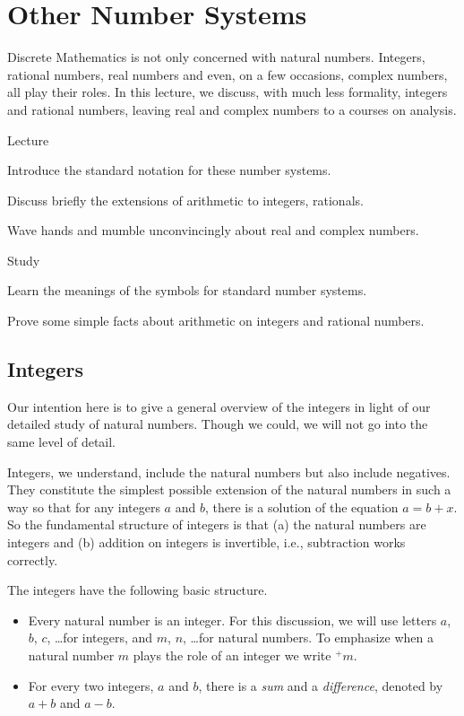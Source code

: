 \chapter{Other Number Systems}\label{lec:OtherNumbers}

Discrete Mathematics is not only concerned with natural numbers. Integers, rational numbers, real numbers and even, on a few occasions, complex numbers, all play their roles. In this lecture, we discuss, with much less formality, integers and rational numbers, leaving real and complex numbers to a courses on analysis.

\begin{goals}
\begin{goal}{Lecture}
\item Introduce the standard notation for these number systems.
\item Discuss briefly the extensions of arithmetic to integers, rationals.
\item Wave hands and mumble unconvincingly about real and complex numbers.
\end{goal}

\begin{goal}{Study}
\item Learn the meanings of the symbols for standard number systems.
\item Prove some simple facts about arithmetic on integers and rational numbers.
\end{goal}
\end{goals}

\section{Integers}

Our intention here is to give a general overview of the integers in light of our detailed study of natural numbers.
Though we could, we will not go into the same level of detail.

Integers, we understand, include the natural numbers but also include negatives. They constitute the simplest possible extension of the natural numbers in such a way so that for any integers $a$ and $b$, there is a solution of the equation $a = b + x$.  
So the fundamental structure of integers is that (a) the natural numbers are integers and (b) addition on integers is invertible, i.e., subtraction works correctly.

\begin{postulate}\label{post:IntSignature}
The integers have the following basic structure.

\begin{itemize}
\item Every natural number is an integer. For this discussion, we will use letters $a$, $b$, $c$, \ldots for integers,
and $m$, $n$, \ldots for natural numbers.
To emphasize when a natural number $m$ plays the role of an integer we write ${}^+m$.
\item For every two integers, $a$ and $b$, there is a \emph{sum} and a \emph{difference}, denoted by $a+b$ and $a-b$. 
\end{itemize}
\end{postulate}

